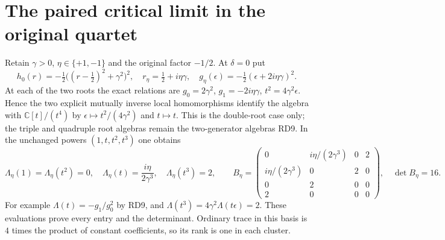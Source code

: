 \documentclass[11pt]{article}
\newcommand{\C}{\mathbb C}
\begin{document}
\section{The paired critical limit in the original quartet}
Retain $\gamma>0$, $\eta\in\{+1,-1\}$ and the original
factor $-1/2$. At $\delta=0$ put
\begin{equation}
 h_0(r)=-\tfrac12\bigl((r-\tfrac12)^2+\gamma^2\bigr)^2,
 \quad r_\eta=\tfrac12+i\eta\gamma,\quad
 g_\eta(\epsilon)=-\tfrac12(\epsilon+2i\eta\gamma)^2 .
 \tag{RD13}
\end{equation}
At each of the two roots the exact relations are
$g_0=2\gamma^2$, $g_1=-2i\eta\gamma$,
$t^2=4\gamma^2\epsilon$. Hence the two explicit mutually
inverse local homomorphisms identify the algebra with
$\C[t]/(t^4)$ by
$\epsilon\mapsto t^2/(4\gamma^2)$ and $t\mapsto t$.
This is the double-root case only; the triple and quadruple
root algebras remain the two-generator algebras RD9.
In the unchanged powers $(1,t,t^2,t^3)$ one obtains
\begin{equation}
 \Lambda_\eta(1)=\Lambda_\eta(t^2)=0,\quad
 \Lambda_\eta(t)=\frac{i\eta}{2\gamma^3},\quad
 \Lambda_\eta(t^3)=2,\qquad
 B_\eta=\begin{pmatrix}
 0&i\eta/(2\gamma^3)&0&2\\
 i\eta/(2\gamma^3)&0&2&0\\
 0&2&0&0\\2&0&0&0
 \end{pmatrix},\quad\det B_\eta=16.
 \tag{RD14}
\end{equation}
For example $\Lambda(t)=-g_1/g_0^2$ by RD9, and
$\Lambda(t^3)=4\gamma^2\Lambda(t\epsilon)=2$.
These evaluations prove every entry and the determinant.
Ordinary trace in this basis is $4$ times the product of
constant coefficients, so its rank is one in each cluster.
\end{document}
